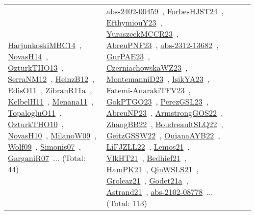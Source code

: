 {\begin{longtable}{lp{3cm}>{\raggedright\arraybackslash}p{6cm}>{\raggedright\arraybackslash}p{6cm}>{\raggedright\arraybackslash}p{8cm}}
\href{../works/HarjunkoskiMBC14.pdf}{HarjunkoskiMBC14}~\cite{HarjunkoskiMBC14}, \href{../works/NovasH14.pdf}{NovasH14}~\cite{NovasH14}, \href{../works/OzturkTHO13.pdf}{OzturkTHO13}~\cite{OzturkTHO13}, \href{../works/SerraNM12.pdf}{SerraNM12}~\cite{SerraNM12}, \href{../works/HeinzB12.pdf}{HeinzB12}~\cite{HeinzB12}, \href{../works/EdisO11.pdf}{EdisO11}~\cite{EdisO11}, \href{../works/ZibranR11a.pdf}{ZibranR11a}~\cite{ZibranR11a}, \href{../works/KelbelH11.pdf}{KelbelH11}~\cite{KelbelH11}, \href{../works/Menana11.pdf}{Menana11}~\cite{Menana11}, \href{../works/TopalogluO11.pdf}{TopalogluO11}~\cite{TopalogluO11}, \href{../works/OzturkTHO10.pdf}{OzturkTHO10}~\cite{OzturkTHO10}, \href{../works/NovasH10.pdf}{NovasH10}~\cite{NovasH10}, \href{../works/MilanoW09.pdf}{MilanoW09}~\cite{MilanoW09}, \href{../works/Wolf09.pdf}{Wolf09}~\cite{Wolf09}, \href{../works/Simonis07.pdf}{Simonis07}~\cite{Simonis07}, \href{../works/GarganiR07.pdf}{GarganiR07}~\cite{GarganiR07}... (Total: 44) & \href{../works/abs-2402-00459.pdf}{abs-2402-00459}~\cite{abs-2402-00459}, \href{../works/ForbesHJST24.pdf}{ForbesHJST24}~\cite{ForbesHJST24}, \href{../works/EfthymiouY23.pdf}{EfthymiouY23}~\cite{EfthymiouY23}, \href{../works/YuraszeckMCCR23.pdf}{YuraszeckMCCR23}~\cite{YuraszeckMCCR23}, \href{../works/AbreuPNF23.pdf}{AbreuPNF23}~\cite{AbreuPNF23}, \href{../works/abs-2312-13682.pdf}{abs-2312-13682}~\cite{abs-2312-13682}, \href{../works/GurPAE23.pdf}{GurPAE23}~\cite{GurPAE23}, \href{../works/CzerniachowskaWZ23.pdf}{CzerniachowskaWZ23}~\cite{CzerniachowskaWZ23}, \href{../works/MontemanniD23.pdf}{MontemanniD23}~\cite{MontemanniD23}, \href{../works/IsikYA23.pdf}{IsikYA23}~\cite{IsikYA23}, \href{../works/Fatemi-AnarakiTFV23.pdf}{Fatemi-AnarakiTFV23}~\cite{Fatemi-AnarakiTFV23}, \href{../works/GokPTGO23.pdf}{GokPTGO23}~\cite{GokPTGO23}, \href{../works/PerezGSL23.pdf}{PerezGSL23}~\cite{PerezGSL23}, \href{../works/AbreuNP23.pdf}{AbreuNP23}~\cite{AbreuNP23}, \href{../works/ArmstrongGOS22.pdf}{ArmstrongGOS22}~\cite{ArmstrongGOS22}, \href{../works/ZhangBB22.pdf}{ZhangBB22}~\cite{ZhangBB22}, \href{../works/BoudreaultSLQ22.pdf}{BoudreaultSLQ22}~\cite{BoudreaultSLQ22}, \href{../works/GeitzGSSW22.pdf}{GeitzGSSW22}~\cite{GeitzGSSW22}, \href{../works/OujanaAYB22.pdf}{OujanaAYB22}~\cite{OujanaAYB22}, \href{../works/LiFJZLL22.pdf}{LiFJZLL22}~\cite{LiFJZLL22}, \href{../works/Lemos21.pdf}{Lemos21}~\cite{Lemos21}, \href{../works/VlkHT21.pdf}{VlkHT21}~\cite{VlkHT21}, \href{../works/Bedhief21.pdf}{Bedhief21}~\cite{Bedhief21}, \href{../works/HamPK21.pdf}{HamPK21}~\cite{HamPK21}, \href{../works/QinWSLS21.pdf}{QinWSLS21}~\cite{QinWSLS21}, \href{../works/Groleaz21.pdf}{Groleaz21}~\cite{Groleaz21}, \href{../works/Godet21a.pdf}{Godet21a}~\cite{Godet21a}, \href{../works/Astrand21.pdf}{Astrand21}~\cite{Astrand21}, \href{../works/abs-2102-08778.pdf}{abs-2102-08778}~\cite{abs-2102-08778}... (Total: 113)\\

\end{longtable}}
